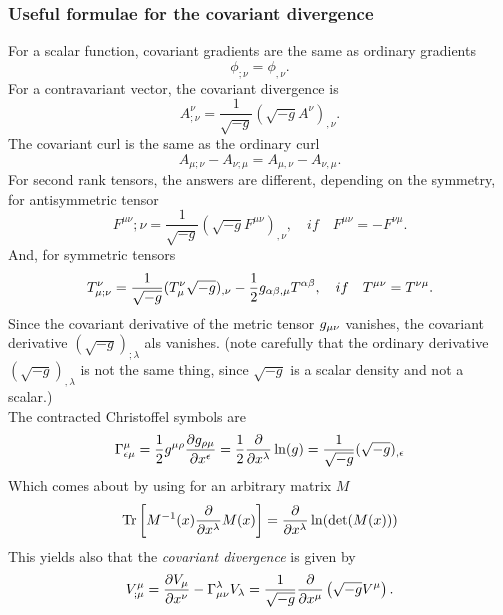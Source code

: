 \subsubsection{Useful formulae for the covariant divergence}
For a scalar function, covariant gradients are the same as ordinary gradients
\begin{equation}
\phi_{;\nu} = \phi_{,\nu}.
\end{equation}
For a contravariant vector, the covariant divergence is
\begin{equation}
A^\nu_{;\nu} = \frac{1}{\sqrt{-g}} (\sqrt{-g}A^\nu)_{, \nu}.
\end{equation}
The covariant curl is the same as the ordinary curl
\begin{equation}
A_{\mu ;\nu} - A_{\nu;\mu} = A_{\mu,\nu} - A_{\nu,\mu}.
\end{equation}
For second rank tensors, the answers are different, depending on the symmetry, for antisymmetric tensor
\begin{equation}
F^{\mu \nu}{;\nu} = \frac{1}{\sqrt{-g}} (\sqrt{-g} F^{\mu \nu})_{,\nu}, \quad if \quad F^{\mu \nu} = - F^{\nu \mu}.
\end{equation}
And, for symmetric tensors
\begin{equation}
T^\nu_{\mu;\nu} = \frac{1}{\sqrt{-g}} (T^\nu_\mu \sqrt{-g})_{, \nu} - \frac{1}{2} g_{\alpha \beta, \mu} T^{\alpha \beta}, \quad if \quad T^{\mu \nu} = T^{\nu \mu}.
\end{equation}
Since the covariant derivative of the metric tensor $g_{\mu \nu}$ vanishes, the covariant derivative $(\sqrt{-g})_{;\lambda}$ als vanishes. (note carefully that the ordinary derivative $(\sqrt{-g})_{,\lambda}$ is not the same thing, since $\sqrt{-g}$ is a scalar density and not a scalar.)\\
The contracted Christoffel symbols are
\begin{equation}
\Gamma^\mu_{\epsilon \mu} =  \frac{1}{2} g^{\mu \rho} \frac{\partial g_{\rho \mu}}{\partial x^\epsilon}= \frac{1}{2}  \frac{\partial}{\partial x^\lambda} \ln(g)=    \frac{1}{\sqrt{-g}} (\sqrt{-g})_{,\epsilon} 
\end{equation}
Which comes about by using for an arbitrary matrix $M$
\begin{equation}
\mathrm{Tr} \left[M^{-1}(x) \frac{\partial}{\partial x^\lambda} M(x)\right] = \frac{\partial}{\partial x^\lambda} \ln(\det(M(x)))
\end{equation}
This yields also that the \emph{covariant divergence} is given by
\begin{equation}
	V^\mu_{;\mu} =\frac{\partial V_\mu}{\partial x^\nu} - \Gamma^\lambda_{\mu \nu} V_\lambda = \frac{1}{\sqrt{-g}} \frac{\partial}{\partial x^\mu} \left(\sqrt{-g} V^\mu\right).
\end{equation}
